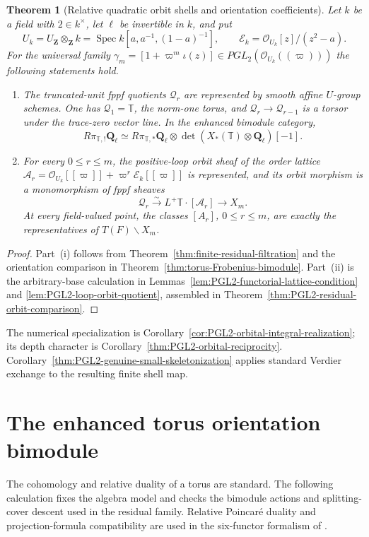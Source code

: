 \documentclass[11pt]{article}
\newtheorem{theorem}{Theorem}[section]
\theoremstyle{definition}
\theoremstyle{remark}
\newcommand{\Qell}{\mathbf Q_\ell}
\newcommand{\UZ}{U_{\mathbf Z}}
\newcommand{\Uk}{U_k}
\newcommand{\Spec}{\operatorname{Spec}}
\begin{document}
\begin{theorem}[Relative quadratic orbit shells and orientation coefficients]
\label{thm:main-PGL2-package}
Let $k$ be a field with $2\in k^\times$, let $\ell$ be invertible in $k$, and
put
\[
 \Uk=\UZ\otimes_{\mathbf Z}k
 =\Spec k[a,a^{-1},(1-a)^{-1}],
 \qquad \mathcal E_k=\mathcal O_{\Uk}[z]/(z^2-a).
\]
For the universal family
$\gamma_m=[1+\varpi^m\iota(z)]\in
PGL_2(\mathcal O_{\Uk}((\varpi)))$ the following
statements hold.
\begin{enumerate}[label=\textup{(\roman*)}]
\item The truncated-unit fppf quotients $\mathscr Q_r$ are represented by
  smooth affine $U$-group schemes.  One has $\mathscr Q_1=\mathbb T$, the
  norm-one torus, and $\mathscr Q_r\to\mathscr Q_{r-1}$ is a torsor under the
  trace-zero vector line.  In the enhanced bimodule category,
  \[
   R\pi_{\mathbb T,!}\Qell
   \simeq R\pi_{\mathbb T,*}\Qell
   \otimes\det(X_*(\mathbb T)\otimes\Qell)[-1].
  \]
\item For every $0\le r\le m$, the positive-loop orbit sheaf of the order
  lattice
  $\mathcal A_r=\mathcal O_{\Uk}[[\varpi]]+\varpi^r\mathcal E_k[[\varpi]]$
  is represented, and its orbit morphism is a monomorphism of fppf sheaves
  \[
   \mathscr Q_r\xrightarrow{\sim}
   L^+\mathbb T\cdot[\mathcal A_r]\longrightarrow X_m.
  \]
  At every field-valued point, the classes $[A_r]$, $0\le r\le m$, are exactly
  the representatives of $T(F)\backslash X_m$.
\end{enumerate}
\end{theorem}

\begin{proof}
Part~\textup{(i)} follows from Theorem~\ref{thm:finite-residual-filtration}
and the orientation comparison in Theorem~\ref{thm:torus-Frobenius-bimodule}.
Part~\textup{(ii)} is the arbitrary-base calculation in
Lemmas~\ref{lem:PGL2-functorial-lattice-condition} and
\ref{lem:PGL2-loop-orbit-quotient}, assembled in
Theorem~\ref{thm:PGL2-residual-orbit-comparison}.
\end{proof}

The numerical specialization is Corollary~\ref{cor:PGL2-orbital-integral-realization};
its depth character is Corollary~\ref{thm:PGL2-orbital-reciprocity}.
Corollary~\ref{thm:PGL2-genuine-small-skeletonization} applies standard
Verdier exchange to the resulting finite shell map.

\section{The enhanced torus orientation bimodule}\label{sec:torus-orientation-bimodule}
The cohomology and relative duality of a torus are standard.  The following
calculation fixes the algebra model and checks the bimodule actions and
splitting-cover descent used in the residual family.  Relative
Poincar\'e duality and projection-formula compatibility are used in the
six-functor formalism of \cite{LaszloOlsson,LiuZhengEnhanced}.
\end{document}
